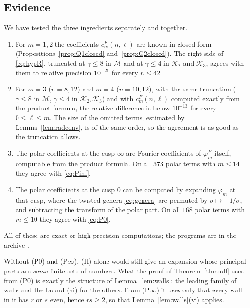 \subsection{Evidence}\label{ssec:evidence}
We have tested the three ingredients separately and together.
\begin{enumerate}
\item[(a)] For $m=1,2$ the coefficients $c^F_m(n,\ell)$ are known in closed form (Propositions~\ref{prop:Q1closed} and~\ref{prop:Q2closed}). The right side of \eqref{eq:hypR}, truncated at $\gamma\le8$ in $\mathcal M$ and at $\gamma\le4$ in $\mathcal K_2$ and $\mathcal K_3$, agrees with them to relative precision $10^{-21}$ for every $n\le42$.
\item[(b)] For $m=3$ ($n=8,12$) and $m=4$ ($n=10,12$), with the same truncation ($\gamma\le8$ in $\mathcal M$, $\gamma\le4$ in $\mathcal K_2,\mathcal K_3$) and with $c^F_m(n,\ell)$ computed exactly from the product formula, the relative difference is below $10^{-13}$ for every $0\le\ell\le m$. The size of the omitted terms, estimated by Lemma~\ref{lem:radconv}, is of the same order, so the agreement is as good as the truncation allows.
\item[(c)] The polar coefficients at the cusp $\infty$ are Fourier coefficients of $\varphi^F_m$ itself, computable from the product formula. On all $373$ polar terms with $m\le14$ they agree with \eqref{eq:Pinf}.
\item[(d)] The polar coefficients at the cusp $0$ can be computed by expanding $\varphi_m$ at that cusp, where the twisted genera \eqref{eq:genera} are permuted by $\sigma\mapsto-1/\sigma$, and subtracting the transform of the polar part. On all $168$ polar terms with $m\le10$ they agree with \eqref{eq:P0}.
\end{enumerate}
All of these are exact or high-precision computations; the programs are in the archive \cite{Bha26c}.

\begin{remark}
Without (P0) and (P$\infty$), (H) alone would still give an expansion whose principal parts are \emph{some} finite sets of numbers. What the proof of Theorem~\ref{thm:all} uses from (P0) is exactly the structure of Lemma~\ref{lem:walls}: the leading family of walls and the bound (vi) for the others. From (P$\infty$) it uses only that every wall in it has $r$ or $s$ even, hence $rs\ge2$, so that Lemma~\ref{lem:walls}(vi) applies.
\end{remark}
